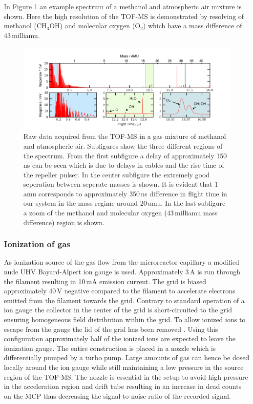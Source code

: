 \documentclass[aip,rsi]{revtex4-1}
\begin{document}
In Figure \ref{fig:untreated_data} an example spectrum of a methanol and atmospheric air mixture is shown. Here the high resolution of the TOF-MS is demonstrated by resolving of methanol (CH$_3$OH) and molecular oxygen (O$_2$) which have a mass difference of 43\,milliamu.
\begin{figure}
 \includegraphics[width=16cm]{untreated_data.png}%
 \caption{Raw data acquired from the TOF-MS in a gas mixture of methanol and atmospheric air. Subfigures show the three different regions of the spectrum. From the first subfigure a delay of approximately 150\,ns can be seen which is due to delays in cables and the rise time of the repeller pulser. In the center subfigure the extremely good seperation between seperate masses is shown. It is evident that 1\,amu corresponds to approximately 350\,ns difference in flight time in our system in the mass regime around 20\,amu. In the last subfigure a zoom of the methanol and molecular oxygen (43\,milliamu mass difference) region is shown.\label{fig:untreated_data}}%
\end{figure}

\subsubsection{Ionization of gas}
As ionization source of the gas flow from the microreactor capillary a modified nude UHV Bayard-Alpert ion gauge is used. Approximately 3\,A is run through the filament resulting in 10\,mA emission current. The grid is biased approximately 40\,V negative compared to the filament to accelerate electrons emitted from the filament towards the grid. Contrary to standard operation of a ion gauge the collector in the center of the grid is short-circuited to the grid ensuring homogeneous field distribution within the grid. To allow ionized ions to escape from the gauge the lid of the grid has been removed \cite{Nottingham1955}. Using this configuration approximately half of the ionized ions are expected to leave the ionization gauge. The entire construction is placed in a nozzle which is differentially pumped by a turbo pump. Large amounts of gas can hence be dosed locally around the ion gauge while still maintaining a low pressure in the source region of the TOF-MS. The nozzle is essential in the setup to avoid high pressure in the acceleration region and drift tube resulting in an increase in dead counts on the MCP thus decreasing the signal-to-noise ratio of the recorded signal.
\end{document}
